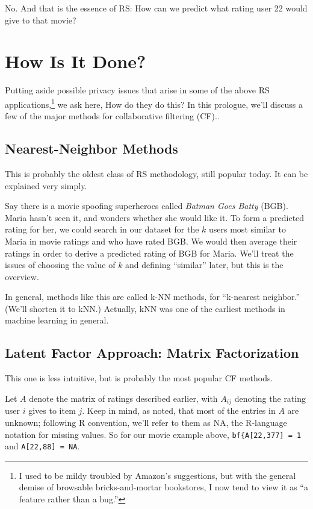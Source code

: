 No.  And that is the essence of RS:  How can we predict what rating user
22 would give to that movie?


\section{How Is It Done?}

Putting aside possible privacy issues that arise in some of the above RS
applications,\footnote{I used to be mildy
troubled by Amazon's suggestions, but with the general demise of
browsable bricks-and-mortar bookstores, I now tend to view it as ``a
feature rather than a bug.''} we ask here, How do they do this?  In this
prologue, we'll discuss a few of the major methods for collaborative
filtering (CF)..

\subsection{Nearest-Neighbor Methods}

This is probably the oldest class of RS methodology, still popular
today.  It can be explained very simply.

Say there is a movie spoofing superheroes called \textit{Batman Goes
Batty} (BGB).  Maria hasn't seen it, and wonders whether she would like
it.  To form a predicted rating for her, we could search in our dataset
for the $k$ users most similar to Maria in movie ratings and who have
rated BGB.  We would then average their ratings in order to derive a
predicted rating of BGB for Maria.  We'll treat the issues of choosing
the value of $k$ and defining ``similar'' later, but this is the
overview.

In general, methods like this are called k-NN methods,
for ``k-nearest neighbor.''  (We'll shorten it to kNN.)
Actually, kNN was one of the earliest methods in machine learning in
general.

\subsection{Latent Factor Approach:  Matrix Factorization}
\label{mf}

This one is less intuitive, but is probably the most popular CF methods.

Let $A$ denote the matrix of ratings described earlier, with $A_{ij}$
denoting the rating user $i$ gives to item $j$.  Keep in mind, as noted,
that most of the entries in $A$ are unknown; following R convention,
we'll refer to them as NA, the R-language notation for missing values.  
So for our movie example above, \lstinline{bf{A[22,377] = 1} and
\lstinline{A[22,88] = NA}.

